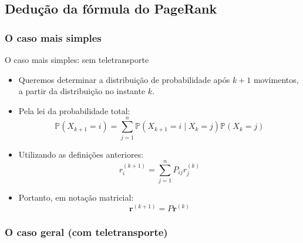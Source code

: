 \documentclass[aspectratio=1610,10pt]{beamer}
\begin{document}
\subsection{Dedução da fórmula do PageRank}

\subsubsection{O caso mais simples}

\begin{frame}{O caso mais simples: sem teletransporte}
\begin{itemize}
    \setlength{\itemsep}{\medskipamount}
    \item Queremos determinar a distribuição de probabilidade
    após $k+1$ movimentos, a partir da distribuição no instante $k$.

    \item Pela lei da probabilidade total:
    \[
    \mathbb{P}(X_{k+1}=i) = \sum_{j=1}^{n} \mathbb{P}(X_{k+1}=i\mid X_k=j) \mathbb{P}(X_k=j)
    \]

    \item Utilizando as definições anteriores:
    \[
    r_i^{(k+1)} = \sum_{j=1}^{n}P_{ij}r_j^{(k)}
    \]

    \item Portanto, em notação matricial:
    \[
    \boxed{ \mathbf{r}^{(k+1)}=P\mathbf{r}^{(k)} }
    \]
\end{itemize}
\end{frame}


\subsubsection{O caso geral (com teletransporte)}
\end{document}
